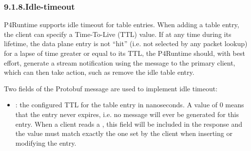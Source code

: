 \documentclass[11pt]{article}
\begin{document}
{%
\subsubsection{9.1.8.\hspace*{0.5em}Idle-timeout}\label{sec-idle-timeout}%

\noindent{}P4Runtime supports idle timeout for table entries. When adding a table entry,
the client can specify a Time-To-Live (TTL) value. If at any time during its
lifetime, the data plane entry is not \textquotedblleft{}hit\textquotedblright{} (i.e. not selected by any packet
lookup) for a lapse of time greater or equal to its TTL, the P4Runtime should,
with best effort, generate a stream notification \textemdash{} using the
 message \textemdash{} to the primary client, which can then take
action, such as remove the idle table entry.%

Two fields of the  Protobuf message are used to implement idle
timeout:%

\begin{itemize}%

\item{}
: the configured TTL for the table entry in nanoseconds. A
value of 0 means that the entry never expires, i.e. no
 message will ever be generated for this entry. When
a client reads a , this field will be included in the response and
the value must match exactly the one set by the client when inserting or
modifying the entry.%


\end{itemize}}
\end{document}
